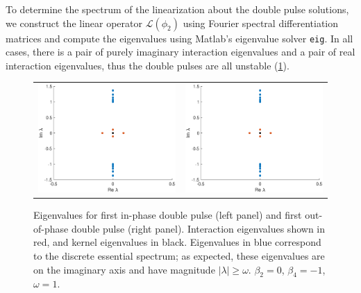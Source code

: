 \documentclass[12pt]{article}
\def\calL{{\mathcal L}}
\begin{document}
To determine the spectrum of the linearization about the double pulse solutions, we construct the linear operator $\calL(\phi_2)$ using Fourier spectral differentiation matrices and compute the eigenvalues using Matlab's eigenvalue solver \texttt{eig}. In all cases, there is a pair of purely imaginary interaction eigenvalues and a pair of real interaction eigenvalues, thus the double pulses are all unstable (\cref{fig:doublespec}).

\begin{figure}[H]
\centering
\begin{tabular}{cc}
\includegraphics[width=8cm]{images/inteigsDP1plus.eps} &
\includegraphics[width=8cm]{images/inteigsDP1plus.eps}
\end{tabular}
\caption{Eigenvalues for first in-phase double pulse (left panel)  and first out-of-phase double pulse (right panel). Interaction eigenvalues shown in red, and kernel eigenvalues in black. Eigenvalues in blue correspond to the discrete essential spectrum; as expected, these eigenvalues are on the imaginary axis and have magnitude $|\lambda| \geq \omega$. $\beta_2 = 0$, $\beta_4 = -1$, $\omega = 1$. }
\label{fig:doublespec}
\end{figure} 




% 

\end{document}

